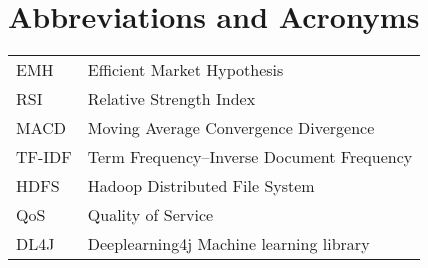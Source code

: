 \chapter*{Abbreviations and Acronyms}


\noindent
\begin{longtable}{@{}p{}p{}@{}}
EMH & Efficient Market Hypothesis \\
RSI & Relative Strength Index \\
MACD & Moving Average Convergence Divergence \\
TF-IDF & Term Frequency–Inverse Document Frequency \\
HDFS & Hadoop Distributed File System \\
QoS & Quality of Service \\
DL4J & Deeplearning4j Machine learning library \\

\end{longtable}
